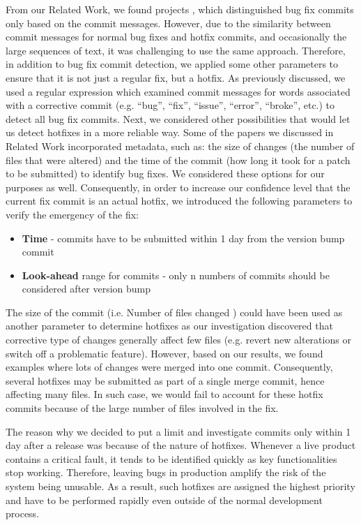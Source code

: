 From our Related Work, we found projects \cite{Hattori2008,Ratzinger2008,Hindle2008}, which distinguished bug fix commits only based on the commit messages. However, due to the similarity between commit messages for normal bug fixes and hotfix commits, and occasionally the large sequences of text, it was challenging to use the same approach. Therefore, in addition to bug fix commit detection, we applied some other parameters to ensure that it is not just a regular fix, but a hotfix. As previously discussed, we used a regular expression which examined commit messages for words associated with a corrective commit (e.g. ``bug'', ``fix'', ``issue'', ``error'', ``broke'', etc.) to detect all bug fix commits. Next, we considered other possibilities that would let us detect hotfixes in a more reliable way. Some of the papers we discussed in Related Work \cite{Hattori2008,Mockus2000,Hindle2008,Kolassa2013} incorporated metadata, such as: the size of changes (the number of files that were altered) and the time of the commit (how long it took for a patch to be submitted) to identify bug fixes. We considered these options for our purposes as well. Consequently, in order to increase our confidence level that the current fix commit is an actual hotfix, we introduced the following parameters to verify the emergency of the fix:
\begin{itemize}
  \item \textbf{Time} - commits have to be submitted within 1 day from the version bump commit
  \item \textbf{Look-ahead} range for commits - only n numbers of commits should be considered after version bump
\end{itemize}

\par
The size of the commit (i.e. Number of files changed ) could have been used as another parameter to determine hotfixes as our investigation discovered that corrective type of changes generally affect few files (e.g. revert new alterations or switch off a problematic feature). However, based on our results, we found examples where lots of changes were merged into one commit. Consequently, several hotfixes may be submitted as part of a single merge commit, hence affecting many files. In such case, we would fail to account for these hotfix commits because of the large number of files involved in the fix.\par

The reason why we decided to put a limit and investigate commits only within 1 day after a release was because of the nature of hotfixes. Whenever a live product contains a critical fault, it tends to be identified quickly as key functionalities stop working. Therefore, leaving bugs in production amplify the risk of the system being unusable. As a result, such hotfixes are assigned the highest priority and have to be performed rapidly even outside of the normal development process.\par

